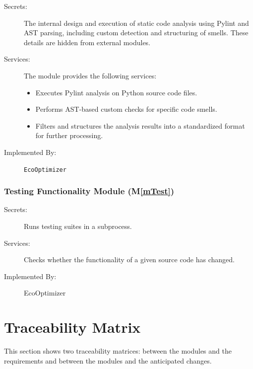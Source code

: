 \documentclass[12pt, titlepage]{article}
\newcommand{\mref}[1]{M\ref{#1}}
\begin{document}
\begin{description}
\item[Secrets:] The internal design and execution of static code analysis using Pylint and AST parsing, including custom detection and structuring of smells. These details are hidden from external modules.
\item[Services:] The module provides the following services:
  \begin{itemize}
    \item Executes Pylint analysis on Python source code files.
    \item Performs AST-based custom checks for specific code smells.
    \item Filters and structures the analysis results into a standardized format for further processing.
  \end{itemize}
\item[Implemented By:] \texttt{EcoOptimizer}
\end{description}

\subsubsection{Testing Functionality Module (\mref{mTest})}


\begin{description}
    \item[Secrets:] Runs testing suites in a subprocess.
    \item[Services:] Checks whether the functionality of a given source code has changed.
    \item[Implemented By:] EcoOptimizer
\end{description}


\section{Traceability Matrix} \label{SecTM}

This section shows two traceability matrices: between the modules and the
requirements and between the modules and the anticipated changes.
\end{document}
